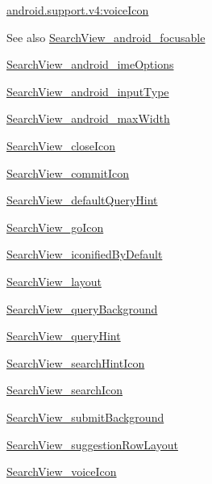 {\ttfamily \hyperlink{classandroid_1_1support_1_1v4_1_1R_1_1styleable_af3c725a4fd59183d49fcefdca539db7a}{android.\+support.\+v4\+:voice\+Icon}}

\begin{DoxySeeAlso}{See also}
\hyperlink{classandroid_1_1support_1_1v4_1_1R_1_1styleable_a15b3e3cff98da6d5a2c8593d91db27c0}{Search\+View\+\_\+android\+\_\+focusable} 

\hyperlink{classandroid_1_1support_1_1v4_1_1R_1_1styleable_aa47416f4b0bf94243cc7bc1d3714bb22}{Search\+View\+\_\+android\+\_\+ime\+Options} 

\hyperlink{classandroid_1_1support_1_1v4_1_1R_1_1styleable_afedfd4965c66397606be2ed3d76fe9c0}{Search\+View\+\_\+android\+\_\+input\+Type} 

\hyperlink{classandroid_1_1support_1_1v4_1_1R_1_1styleable_aa1fcd209f07b6bb82802f5b87852f157}{Search\+View\+\_\+android\+\_\+max\+Width} 

\hyperlink{classandroid_1_1support_1_1v4_1_1R_1_1styleable_af517a70a4f7a1112d44a394839d8ffaf}{Search\+View\+\_\+close\+Icon} 

\hyperlink{classandroid_1_1support_1_1v4_1_1R_1_1styleable_a249a336fa30e7f77fa15e369b5db4e59}{Search\+View\+\_\+commit\+Icon} 

\hyperlink{classandroid_1_1support_1_1v4_1_1R_1_1styleable_a0dba0574ce30d30bc8ac0941fe674251}{Search\+View\+\_\+default\+Query\+Hint} 

\hyperlink{classandroid_1_1support_1_1v4_1_1R_1_1styleable_a4650e52ef5aadf8f43fe5a614b055cc4}{Search\+View\+\_\+go\+Icon} 

\hyperlink{classandroid_1_1support_1_1v4_1_1R_1_1styleable_a417d0b0a020ec93e98525e018b21b07a}{Search\+View\+\_\+iconified\+By\+Default} 

\hyperlink{classandroid_1_1support_1_1v4_1_1R_1_1styleable_a2df4c8970df3d39b8fca7d3605a3ac4d}{Search\+View\+\_\+layout} 

\hyperlink{classandroid_1_1support_1_1v4_1_1R_1_1styleable_ac2a79ceebc50d310a3dbad7676afab25}{Search\+View\+\_\+query\+Background} 

\hyperlink{classandroid_1_1support_1_1v4_1_1R_1_1styleable_a2094501d783cc294675c58b0b5ef484a}{Search\+View\+\_\+query\+Hint} 

\hyperlink{classandroid_1_1support_1_1v4_1_1R_1_1styleable_a061d67b6fc4b4b493ef5993fa1bcf0ce}{Search\+View\+\_\+search\+Hint\+Icon} 

\hyperlink{classandroid_1_1support_1_1v4_1_1R_1_1styleable_ab225bc2b5b5cdc07178516697d75824e}{Search\+View\+\_\+search\+Icon} 

\hyperlink{classandroid_1_1support_1_1v4_1_1R_1_1styleable_ad5c34c512b8b52cc4e15a14f900ed036}{Search\+View\+\_\+submit\+Background} 

\hyperlink{classandroid_1_1support_1_1v4_1_1R_1_1styleable_a8f88c91f413bd187e3c108b18f21cd8c}{Search\+View\+\_\+suggestion\+Row\+Layout} 

\hyperlink{classandroid_1_1support_1_1v4_1_1R_1_1styleable_af3c725a4fd59183d49fcefdca539db7a}{Search\+View\+\_\+voice\+Icon} 
\end{DoxySeeAlso}
